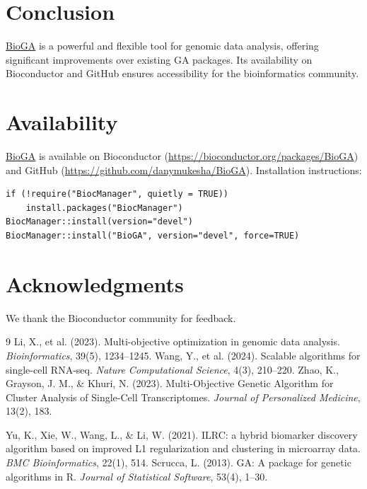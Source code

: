 \documentclass{report}
\begin{document}
\section{Conclusion}
\textcolor{teal}{\href{https://bioconductor.org/packages/release/bioc/html/BioGA.html}{BioGA}} is a powerful and flexible tool for genomic data analysis, offering significant improvements over existing GA packages. Its availability on Bioconductor and GitHub ensures accessibility for the bioinformatics community.

\section{Availability}
\textcolor{teal}{\href{https://bioconductor.org/packages/release/bioc/html/BioGA.html}{BioGA}} 
is available on Bioconductor (\url{https://bioconductor.org/packages/BioGA})
and GitHub (\url{https://github.com/danymukesha/BioGA}). Installation instructions:

\begin{verbatim}
if (!require("BiocManager", quietly = TRUE))
    install.packages("BiocManager")
BiocManager::install(version="devel")
BiocManager::install("BioGA", version="devel", force=TRUE)
\end{verbatim}

\section{Acknowledgments}
We thank the Bioconductor community for feedback.


\begin{thebibliography}{9}
Li, X., et al. (2023). Multi-objective optimization in genomic data analysis. \textit{Bioinformatics}, 39(5), 1234--1245.
Wang, Y., et al. (2024). Scalable algorithms for single-cell RNA-seq. \textit{Nature Computational Science}, 4(3), 210--220.
Zhao, K., Grayson, J. M., \& Khuri, N. (2023). Multi-Objective Genetic Algorithm for Cluster Analysis of Single-Cell Transcriptomes. \textit{Journal of Personalized Medicine}, 13(2), 183.

Yu, K., Xie, W., Wang, L., \& Li, W. (2021). ILRC: a hybrid biomarker discovery algorithm based on improved L1 regularization and clustering in microarray data. \textit{BMC Bioinformatics}, 22(1), 514.
Scrucca, L. (2013). GA: A package for genetic algorithms in R. \textit{Journal of Statistical Software}, 53(4), 1--30.
\end{thebibliography}
\end{document}
